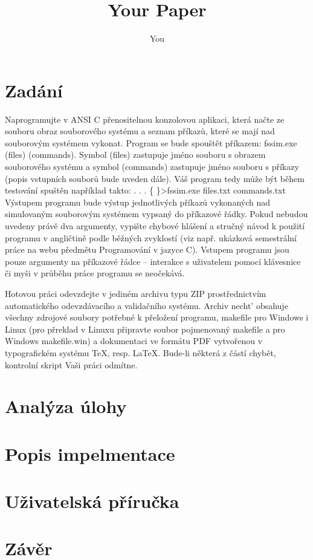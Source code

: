 \documentclass[a4paper]{article}
\title{Your Paper}
\author{You}
\begin{document}
\maketitle

\section{Zadání}

Naprogramujte v ANSI C přenositelnou konzolovou aplikaci, která načte ze souboru obraz souborového systému a seznam příkazů, které se mají nad souborovým systémem vykonat.
Program se bude spouštět příkazem: fssim.exe (files) (commands). Symbol (files) zastupuje jméno souboru s obrazem souborového systému a symbol (commands) zastupuje jméno souboru s příkazy (popis vstupních souborů bude uveden dále). Váš program tedy může být během testování spuštěn například takto:
. . . \{ \}>fssim.exe files.txt commands.txt
Výstupem programu bude výstup jednotlivých příkazů vykonaných nad simulovaným souborovým systémem vypsaný do příkazové řádky. Pokud nebudou uvedeny právě dva argumenty, vypište chybové hlášení a stručný návod k použití programu v angličtině podle běžných zvyklostí (viz např. ukázková semestrální práce na webu předmětu Programování v jazyce C). Vstupem programu jsou pouze argumenty na příkazové řádce – interakce s uživatelem pomocí klávesnice
či myši v průběhu práce programu se neočekává.

Hotovou práci odevzdejte v jediném archivu typu ZIP prostřednictvím automatického odevzdávacího a validačního systému. Archiv necht’ obsahuje všechny zdrojové soubory potřebné k přeložení programu, makefile pro Windows i Linux (pro přreklad v Linuxu připravte soubor pojmenovaný makefile a pro Windows makefile.win) a dokumentaci ve formátu PDF vytvořenou v typograﬁckém systému \TeX, resp. \LaTeX. Bude-li některá z částí chybět, kontrolní skript Vaši práci
odmítne.

\section{Analýza úlohy}

\section{Popis impelmentace}

\section{Uživatelská příručka}

\section{Závěr}




\end{document}
